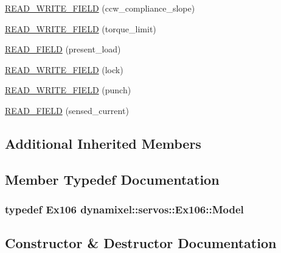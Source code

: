 \begin{DoxyCompactItemize}
\hyperlink{classdynamixel_1_1servos_1_1_ex106_ae4ef846b3e304abc918d5e0e79e0c11a}{R\+E\+A\+D\+\_\+\+W\+R\+I\+T\+E\+\_\+\+F\+I\+E\+LD} (ccw\+\_\+compliance\+\_\+slope)
\item 
\hyperlink{classdynamixel_1_1servos_1_1_ex106_a59dcbcd17fc92e2eda43ca8e7201eec2}{R\+E\+A\+D\+\_\+\+W\+R\+I\+T\+E\+\_\+\+F\+I\+E\+LD} (torque\+\_\+limit)
\item 
\hyperlink{classdynamixel_1_1servos_1_1_ex106_a67f5a8707a0e79f579a3f24ac7f0f7a7}{R\+E\+A\+D\+\_\+\+F\+I\+E\+LD} (present\+\_\+load)
\item 
\hyperlink{classdynamixel_1_1servos_1_1_ex106_a128e525aa4561eceb3e725d195042005}{R\+E\+A\+D\+\_\+\+W\+R\+I\+T\+E\+\_\+\+F\+I\+E\+LD} (lock)
\item 
\hyperlink{classdynamixel_1_1servos_1_1_ex106_ac6869c7fa60029e59e72b58034996738}{R\+E\+A\+D\+\_\+\+W\+R\+I\+T\+E\+\_\+\+F\+I\+E\+LD} (punch)
\item 
\hyperlink{classdynamixel_1_1servos_1_1_ex106_a3390822cf9fa0d09df2207f92a5a1d0d}{R\+E\+A\+D\+\_\+\+F\+I\+E\+LD} (sensed\+\_\+current)
\end{DoxyCompactItemize}
\subsection*{Additional Inherited Members}


\subsection{Member Typedef Documentation}
\subsubsection[{\texorpdfstring{Model}{Model}}]{\setlength{\rightskip}{0pt plus 5cm}typedef {\bf Ex106} {\bf dynamixel\+::servos\+::\+Ex106\+::\+Model}}\hypertarget{classdynamixel_1_1servos_1_1_ex106_a82a4328e82ded805df0615ea61fc2458}{}\label{classdynamixel_1_1servos_1_1_ex106_a82a4328e82ded805df0615ea61fc2458}


\subsection{Constructor \& Destructor Documentation}
